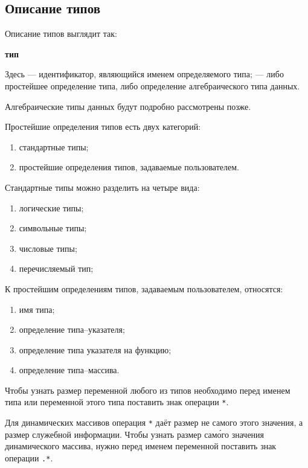 \documentclass[10pt]{report}
\begin{document}
        \subsection{Описание типов}
Описание типов выглядит так:
\begin{center}
\noindent\textbf{тип} \textcolor{Green}{}
\end{center}

Здесь \textcolor{Green}{} --- идентификатор, являющийся именем определяемого типа; \textcolor{Green}{} --- либо
простейшее определение типа, либо определение алгебраического типа данных.

Алгебраические типы данных будут подробно рассмотрены позже. 

Простейшие определения типов есть двух категорий:
\begin{enumerate}
    \item стандартные типы;
    \item простейшие определения типов, задаваемые пользователем.
\end{enumerate}

Стандартные типы можно разделить на четыре вида:
\begin{enumerate}
    \item логические типы;
    \item символьные типы;
    \item числовые типы;
    \item перечисляемый тип;
\end{enumerate}

К простейшим определениям типов, задаваемым пользователем, относятся:
\begin{enumerate}
    \item имя типа;
    \item определение типа--указателя;
    \item определение типа указателя на функцию;
    \item определение типа--массива.
\end{enumerate}

Чтобы узнать размер переменной любого из типов необходимо перед именем типа или переменной этого типа поставить знак операции \texttt{*}.

Для динамических массивов операция \texttt{*} даёт размер не самого этого значения, а размер служебной информации. Чтобы узнать размер сам\'{о}го
значения динамического массива, нужно перед именем переменной поставить знак операции \texttt{.*}.
\end{document}

